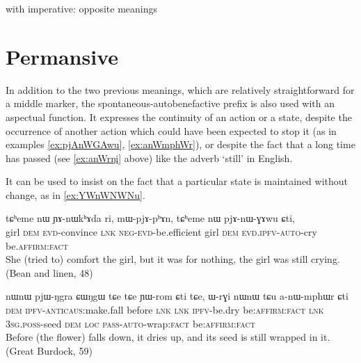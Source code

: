 \documentclass[oldfontcommands,oneside,a4paper,11pt]{article}
\newcommand{\ipa}[1]{{\phon \mbox{#1}}} %
\begin{document}

with imperative: opposite meanings

\section{Permansive}
In addition to the two previous meanings, which are relatively straightforward for a middle marker, the spontaneous-autobenefactive prefix is also used with an aspectual function. It expresses the continuity of an action or a state, despite the occurrence of another action which could have been expected to stop it (as in examples \ref{ex:pjAnWGAwu}, \ref{ex:anWmphWr}), or despite the fact that a long time has passed (see \ref{ex:anWrŋi} above) like the adverb `still' in English. 

It can be used to insist on the fact  that a particular state is maintained without change, as in \ref{ex:YWnWNWNu}.

\begin{exe}
\ex \label{ex:pjAnWGAwu}
\gll
\ipa{tɕʰeme} 	\ipa{nɯ} 	\ipa{ɲɤ-nɯkʰɤda} 	\ipa{ri,} 	\ipa{mɯ-pjɤ-pʰɤn,} 	\ipa{tɕʰeme} 	\ipa{nɯ} 	\ipa{pjɤ-nɯ-ɣɤwu} 	\ipa{ɕti,} \\
girl \textsc{dem} \textsc{evd}-convince \textsc{lnk} \textsc{neg-evd}-be.efficient girl \textsc{dem} \textsc{evd.ipfv-auto}-cry  be.\textsc{affirm:fact} \\
\glt She (tried to) comfort the girl, but it was for nothing, the girl was still crying. (Bean and linen, 48)
\end{exe} 

\begin{exe}
\ex \label{ex:anWmphWr}
\gll
\ipa{nɯnɯ} 	\ipa{pjɯ-ŋgra} 	\ipa{ɕɯŋgɯ} 	\ipa{tɕe} 	\ipa{tɕe} 	\ipa{ɲɯ-rom} 	\ipa{ɕti} 	\ipa{tɕe,} 	\ipa{ɯ-rɣi} 	\ipa{nɯnɯ} 	\ipa{tɕu} 	\ipa{a-nɯ-mphɯr} 	\ipa{ɕti} \\
\textsc{dem} \textsc{ipfv-anticaus}:make.fall before \textsc{lnk}  \textsc{lnk} \textsc{ipfv}-be.dry be\textsc{:affirm:fact} \textsc{lnk} \textsc{3sg.poss}-seed \textsc{dem} \textsc{loc} \textsc{pass-auto}-wrap:\textsc{fact} be\textsc{:affirm:fact} \\
\glt Before (the flower) falls down, it dries up, and its seed is still wrapped in it. (Great Burdock, 59)
\end{exe} 
\end{document}
